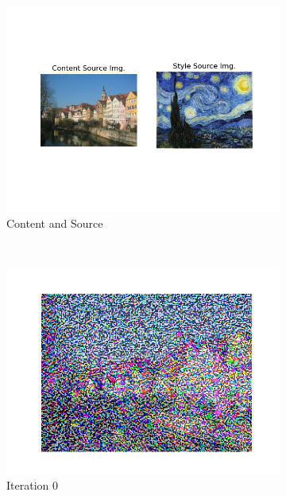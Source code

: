 \documentclass[12pt]{article}
\begin{document}
\begin{figure}[htbp]
    \centering
    \begin{subfigure}[t]{0.48\textwidth}
        \centering
        \includegraphics[trim={3in 1in 3in 1in},scale=0.8]{./Homework2/output/hw2p2_fig09.png}
        \caption{Content and Source}
    \label{hw2p2k}
    \end{subfigure}\\
    \begin{subfigure}[t]{0.48\textwidth}
        \centering
        \includegraphics[trim={3in 0in 3in 0in},scale=0.5]{./Homework2/output/hw2p2_fig10.png}
        \caption{Iteration 0}
    \label{hw2p2l}
    \end{subfigure}
    \begin{subfigure}[t]{0.48\textwidth}

\end{subfigure}
\end{figure}
\end{document}
